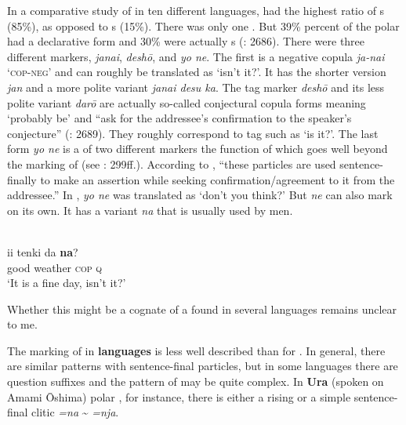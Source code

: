 In a comparative study of  in ten different languages,  had the highest ratio of s (85\%), as opposed to s (15\%). There was only one . But 39\% percent of the polar  had a declarative form and 30\% were actually s (\citealt{HayashiM2010}: 2686). There were three different  markers, \textit{janai}, \textit{desh\=o}, and \textit{yo ne}. The first is a negative copula \textit{ja-nai} ‘\textsc{cop}-\textsc{neg}’ and can roughly be translated as ‘isn’t it?’. It has the shorter version \textit{jan} and a more polite variant \textit{janai desu ka}. The tag marker \textit{desh\=o} and its less polite variant \textit{dar\=o} are actually so-called conjectural copula forms meaning ‘probably be’ \citep[80]{Hasegawa2015} and “ask for the addressee’s confirmation to the speaker’s conjecture” (\citealt{HayashiM2010}: 2689). They roughly correspond to  tag  such as ‘is it?’. The last form \textit{yo ne} is a  of two different markers the function of which goes well beyond the marking of  (see \citealt{Hasegawa2015}: 299ff.). According to \citet[2690]{HayashiM2010}, “these particles are used sentence-finally to make an assertion while seeking confirmation/agreement to it from the addressee.” In , \textit{yo ne} was translated as ‘don’t you think?’ But \textit{ne} can also mark  on its own. It has a variant \textit{na} that is usually used by men.

\ea%
    \label{ex:japa:14}
    \\
    \gll ii  tenki    da \textbf{{na}}?\\
    good  weather  \textsc{cop}  \textsc{q}\\
    \glt ‘It is a fine day, isn’t it?’ \citep[296]{Hasegawa2015}
    \z

\noindent Whether this might be a cognate of a  found in several  languages remains unclear to me.

The marking of  in \textbf{ languages} is less well described than for . In general, there are similar patterns with sentence-final particles, but in some languages there are question suffixes and the pattern of  may be quite complex. In \textbf{Ura} (spoken on Amami \=Oshima) polar , for instance, there is either a rising  or a simple sentence-final clitic \textit{=na} {\textasciitilde} \textit{=nja}.

